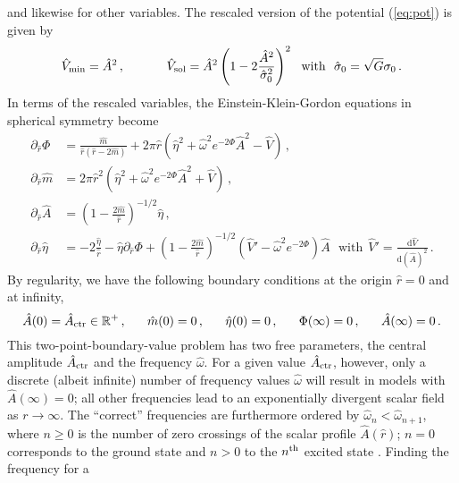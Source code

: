 \documentclass[11pt]{report}  %
\newcommand{\du}{\mathrm{d}}
\begin{document}
%
and likewise for other variables. The rescaled version
of the potential (\ref{eq:pot}) is given by
%
\begin{equation}
  \hat{V}_{\rm min} = \hat{A}^2\,,~~~~~~~~~~
  \hat{V}_{\rm sol} =
  \hat{A}^2
  \left(
  1-2\frac{\hat{A}^2}{\hat{\sigma}_0^2}
  \right)^2~~\text{with}~~\hat{\sigma}_0=\sqrt{G}\sigma_0\,.
  \label{eq:potentials}
\end{equation}
%
In terms of the rescaled variables, the Einstein-Klein-Gordon
equations in spherical symmetry become
%
\begin{align}
  \partial_{\hat{r}}\Phi &=
  \frac{\hat{m}}{\hat{r}(\hat{r}-2\hat{m})}
  +
  2\pi \hat{r}
  \left(
  \hat{\eta}^2
  +\hat{\omega}^2e^{-2\Phi}\hat{A}^2
  -\hat{V}
  \right)\,, \label{eq:Phir} \\
  \partial_{\hat{r}}\hat{m} &=
  2\pi \hat{r}^2
  \left(
  \hat{\eta}^2
  +\hat{\omega}^2e^{-2\Phi}\hat{A}^2
  +\hat{V}
  \right)\,,
  \\
  \partial_{\hat{r}}\hat{A} &=
  \left(
  1-\frac{2\hat{m}}{\hat{r}}
  \right)^{-1/2}
  \hat{\eta}\,, \\
  \partial_{\hat{r}} \hat{\eta} &=
  -2\frac{\hat{\eta}}{\hat{r}}
  -\hat{\eta}\partial_{\hat{r}}\Phi
  +\left(
  1-\frac{2\hat{m}}{\hat{r}}
  \right)^{-1/2}
  (\hat{V}'-\hat{\omega}^2e^{-2\Phi})\hat{A}~~~
  \text{with}~~
  \hat{V}'=\frac{\du \hat{V}}{\du (\hat{A})^2}\,.
  \label{eq:etar}
\end{align}
%
By regularity, we have the following boundary conditions
at the origin $\hat{r}=0$ and at infinity,
%
\begin{equation}
  \hat{A}(0) = \hat{A}_{\rm ctr} \in \mathbb{R}^+\,,~~~~~
  \hat{m}(0) = 0\,,~~~~~
  \hat{\eta}(0) = 0\,,~~~~~
  \Phi(\infty) = 0\,,~~~~~
  \hat{A}(\infty) = 0\,.
\end{equation}
%
This two-point-boundary-value problem has two free
parameters, the central amplitude $\hat{A}_{\rm ctr}$ and the frequency
$\hat{\omega}$. For a given value $\hat{A}_{\rm ctr}$, however, only
a discrete (albeit infinite) number of frequency values
$\hat{\omega}$ will result in models with $\hat{A}(\infty)=0$;
all other frequencies lead to an exponentially divergent scalar
field as $r\rightarrow \infty$. The ``correct'' frequencies
are furthermore ordered by $\hat{\omega}_n<\hat{\omega}_{n+1}$,
where $n\ge 0$ is the number of zero crossings of the scalar
profile $\hat{A}(\hat{r})$; $n=0$ corresponds to the ground state
and $n>0$ to the $n^{\rm th}$ excited state
\cite{Balakrishna:1997ej}.
Finding the frequency for a
\end{document}
